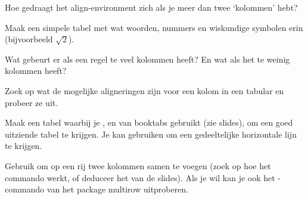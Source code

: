 \documentclass[a4paper]{article}
\begin{document}
\begin{exercise}[Align]
    Hoe gedraagt het align-environment zich als je meer dan twee `kolommen' hebt?
\end{exercise}

\begin{exercise}
    Maak een simpele tabel met wat woorden, nummers en wiskundige symbolen erin (bijvoorbeeld $ \sqrt{2} $).
\end{exercise}

\begin{exercise}[Kolomscheidingen]
    Wat gebeurt er als een regel te veel kolommen heeft? En wat als het te
    weinig kolommen heeft?
\end{exercise}

\begin{exercise}[Alignering]
    Zoek op wat de mogelijke aligneringen zijn voor een kolom in een tabular
    en probeer ze uit.
\end{exercise}

\begin{exercise}[Booktabs]
    Maak een tabel waarbij je \texttt{\toprule}, \texttt{\midrule}
    en \texttt{\bottom} van booktabs gebruikt (zie slides), om
    een goed uitziende tabel te krijgen. Je kan \texttt{\cmidrule} gebruiken om een
    gedeeltelijke horizontale lijn te krijgen.
\end{exercise}

\begin{exercise}[Excellent]
    Gebruik \texttt{\multicolumn} om op een rij twee kolommen samen te voegen
    (zoek op hoe het commando werkt, of deduceer het van de slides). Als je
    wil kan je ook het \texttt{\multirow}-commando van het package multirow
    uitproberen.
\end{exercise}


\end{document}
